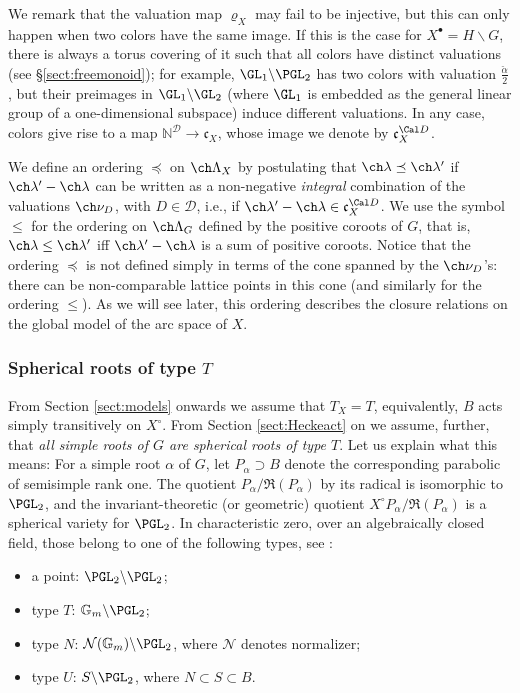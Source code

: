 \documentclass[final]{amsart}
\theoremstyle{remark}
\theoremstyle{definition}
\numberwithin{equation}{section}
\begin{document}
We remark that the valuation map $\varrho_X$ may fail to be injective, but this can only happen when two colors have the same image. If this is the case for $X^\bullet = H\backslash G$, there is always a torus covering of it such that all colors have distinct valuations (see \S\ref{sect:freemonoid}); for example, $\GL_1\backslash \PGL_2$ has two colors with valuation $\frac{\check\alpha}{2}$, but their preimages in $\GL_1\backslash\GL_2$ (where $\GL_1$ is embedded as the general linear group of a one-dimensional subspace) induce different valuations. 
In any case, colors give rise to a map $\mathbb N^{\mathcal D}\to \mathfrak c_X$, whose image we denote by $\mathfrak c_X^{\Cal D}$. 

We define an ordering $\preceq$ on $\ch\Lambda_X$ by postulating that $\ch\lambda \preceq \ch\lambda'$ if 
$\ch\lambda'-\ch\lambda$ can be written as a non-negative \emph{integral} combination of the valuations $\ch\nu_D$, with $D\in \mathcal D$, i.e., if $\ch\lambda'-\ch\lambda \in \mathfrak c_X^{\Cal D}$. We use the symbol $\le $ for the ordering on $\ch\Lambda_G$ defined by the positive coroots of $G$, that is, $\ch\lambda \le \ch\lambda'$ iff $\ch\lambda'-\ch\lambda$ is a sum of positive coroots. Notice that the ordering $\preceq$ is not defined simply in terms of the cone spanned by the $\ch\nu_D$'s: there can be non-comparable lattice points in this cone (and similarly for the ordering $\le$). 
As we will see later, this ordering describes the closure relations on the global model 
of the arc space of $X$.

\subsubsection{Spherical roots of type $T$} 
\label{subsection:typeT}

From Section \ref{sect:models} onwards we assume that $T_X=T$, equivalently, $B$ acts simply transitively on $X^\circ$. From Section \ref{sect:Heckeact} on we assume, further, that \emph{all simple roots of $G$ are spherical roots of type $T$}. Let us explain what this means: 
For a simple root $\alpha$ of $G$, let $P_\alpha \supset B$ denote 
the corresponding parabolic of semisimple rank one. The quotient $P_\alpha/\mathfrak R(P_\alpha)$ by its radical is isomorphic to $\PGL_2$, and the invariant-theoretic (or geometric) quotient $X^\circ P_\alpha/\mathfrak R(P_\alpha)$ is a spherical variety for $\PGL_2$. In characteristic zero, over an algebraically closed field, those belong to one of the following types, see \cite[Lemma 3.2]{KnBorbit}:
\begin{itemize}
 \item a point: $\PGL_2\backslash\PGL_2$;
 \item type $T$: $\mathbb G_m\backslash \PGL_2$;
 \item type $N$: $\mathcal N(\mathbb G_m)\backslash\PGL_2$, where $\mathcal N$ denotes normalizer;
 \item type $U$: $S\backslash \PGL_2$, where $N\subset S\subset B$. 
\end{itemize}
\end{document}
